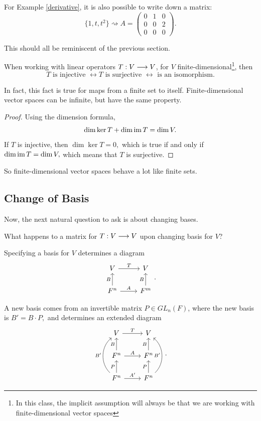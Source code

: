 For Example \ref{derivative}, it is also possible to write down a matrix: \[\{1, t, t^2\} \rightsquigarrow A = \begin{pmatrix}
0 & 1 & 0 \\
0 & 0 & 2 \\
0 & 0 & 0
\end{pmatrix}.\]

This should all be reminiscent of the previous section. 

\begin{proposition}
When working with linear operators $T: V \longrightarrow V$, for $V$ finite-dimensional\footnote{In this class, the implicit assumption will always be that we are working with finite-dimensional vector spaces}, then \[T \text{ is injective }\leftrightarrow T \text{ is surjective }\leftrightarrow \text{ is an isomorphism.}\]
\end{proposition}

In fact, this fact is true for maps from a finite set to itself. Finite-dimensional vector spaces can be infinite, but have the same property.

\begin{proof}
Using the dimension formula, 
\[\dim \ker T + \dim \operatorname{im} T = \dim V.\] If $T$ is injective, then $\dim\ker T = 0,$ which is true if and only if $\dim\operatorname{im} T = \dim V,$ which means that $T$ is surjective. 
\end{proof}

So finite-dimensional vector spaces behave a lot like finite sets. 

\subsection{Change of Basis}

Now, the next natural question to ask is about changing bases. 
\begin{qq}
What happens to a matrix for $T: V \longrightarrow V$ upon changing basis for $V$?
\end{qq}

Specifying a basis for $V$ determines a diagram  \[
\begin{tikzcd}
V \arrow[r, "T"] & V \\
F^n \arrow[u, "B"]\arrow[r, "A"] & F^m \arrow[u, "B"]
\end{tikzcd}.
\]

A new basis comes from an invertible matrix $P \in GL_n(F)$, where the new basis is $B' = B \cdot P,$ and determines an extended diagram 
\[\begin{tikzcd}
V \arrow[r, "T"] & V \\
F^n \arrow[u, "B"]\arrow[r, "A"] & F^n \arrow[u, "B"] \\
F^n \arrow[u, "P"] \arrow[uu, bend left=49, "B'"] \arrow[r, "A'"] & F^n \arrow[u, "P"] \arrow[uu, bend right=49, "B'"]
\end{tikzcd}.
\]

